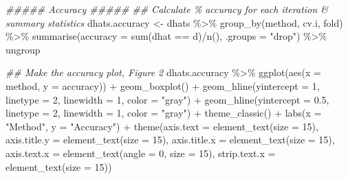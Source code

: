 \documentclass[
  letterpaper,
  DIV=11,
  numbers=noendperiod]{scrreprt}
\newenvironment{Shaded}{\begin{snugshade}}{\end{snugshade}}
\newcommand{\AttributeTok}[1]{\textcolor[rgb]{0.40,0.45,0.13}{#1}}
\newcommand{\DecValTok}[1]{\textcolor[rgb]{0.68,0.00,0.00}{#1}}
\newcommand{\DocumentationTok}[1]{\textcolor[rgb]{0.37,0.37,0.37}{\textit{#1}}}
\newcommand{\FloatTok}[1]{\textcolor[rgb]{0.68,0.00,0.00}{#1}}
\newcommand{\FunctionTok}[1]{\textcolor[rgb]{0.28,0.35,0.67}{#1}}
\newcommand{\NormalTok}[1]{\textcolor[rgb]{0.00,0.23,0.31}{#1}}
\newcommand{\OtherTok}[1]{\textcolor[rgb]{0.00,0.23,0.31}{#1}}
\newcommand{\SpecialCharTok}[1]{\textcolor[rgb]{0.37,0.37,0.37}{#1}}
\newcommand{\StringTok}[1]{\textcolor[rgb]{0.13,0.47,0.30}{#1}}
\begin{document}
\begin{Shaded}
\begin{Highlighting}[]
\DocumentationTok{\#\#\#\#\# Accuracy \#\#\#\#\#}
\DocumentationTok{\#\# Calculate \% accuracy for each iteration \& summary statistics}
\NormalTok{dhats.accuracy }\OtherTok{\textless{}{-}}\NormalTok{ dhats }\SpecialCharTok{\%\textgreater{}\%}
  \FunctionTok{group\_by}\NormalTok{(method, cv.i, fold) }\SpecialCharTok{\%\textgreater{}\%}
  \FunctionTok{summarise}\NormalTok{(}\AttributeTok{accuracy =} \FunctionTok{sum}\NormalTok{(dhat }\SpecialCharTok{==}\NormalTok{ d)}\SpecialCharTok{/}\FunctionTok{n}\NormalTok{(), }\AttributeTok{.groups =} \StringTok{"drop"}\NormalTok{) }\SpecialCharTok{\%\textgreater{}\%}
\NormalTok{  ungroup}

\DocumentationTok{\#\# Make the accuracy plot, Figure 2}
\NormalTok{dhats.accuracy }\SpecialCharTok{\%\textgreater{}\%}
  \FunctionTok{ggplot}\NormalTok{(}\FunctionTok{aes}\NormalTok{(}\AttributeTok{x =}\NormalTok{ method, }\AttributeTok{y =}\NormalTok{ accuracy)) }\SpecialCharTok{+}
  \FunctionTok{geom\_boxplot}\NormalTok{() }\SpecialCharTok{+}
  \FunctionTok{geom\_hline}\NormalTok{(}\AttributeTok{yintercept =} \DecValTok{1}\NormalTok{, }\AttributeTok{linetype =} \DecValTok{2}\NormalTok{, }\AttributeTok{linewidth =} \DecValTok{1}\NormalTok{, }\AttributeTok{color =} \StringTok{"gray"}\NormalTok{) }\SpecialCharTok{+}
  \FunctionTok{geom\_hline}\NormalTok{(}\AttributeTok{yintercept =} \FloatTok{0.5}\NormalTok{, }\AttributeTok{linetype =} \DecValTok{2}\NormalTok{, }\AttributeTok{linewidth =} \DecValTok{1}\NormalTok{, }\AttributeTok{color =} \StringTok{"gray"}\NormalTok{) }\SpecialCharTok{+}
  \FunctionTok{theme\_classic}\NormalTok{() }\SpecialCharTok{+}
  \FunctionTok{labs}\NormalTok{(}\AttributeTok{x =} \StringTok{"Method"}\NormalTok{, }\AttributeTok{y =} \StringTok{"Accuracy"}\NormalTok{) }\SpecialCharTok{+}
  \FunctionTok{theme}\NormalTok{(}\AttributeTok{axis.text =} \FunctionTok{element\_text}\NormalTok{(}\AttributeTok{size =} \DecValTok{15}\NormalTok{),}
        \AttributeTok{axis.title.y =} \FunctionTok{element\_text}\NormalTok{(}\AttributeTok{size =} \DecValTok{15}\NormalTok{),}
        \AttributeTok{axis.title.x =} \FunctionTok{element\_text}\NormalTok{(}\AttributeTok{size =} \DecValTok{15}\NormalTok{),}
        \AttributeTok{axis.text.x =} \FunctionTok{element\_text}\NormalTok{(}\AttributeTok{angle =} \DecValTok{0}\NormalTok{, }\AttributeTok{size =} \DecValTok{15}\NormalTok{),}
        \AttributeTok{strip.text.x =} \FunctionTok{element\_text}\NormalTok{(}\AttributeTok{size =} \DecValTok{15}\NormalTok{))}
\end{Highlighting}
\end{Shaded}
\end{document}
